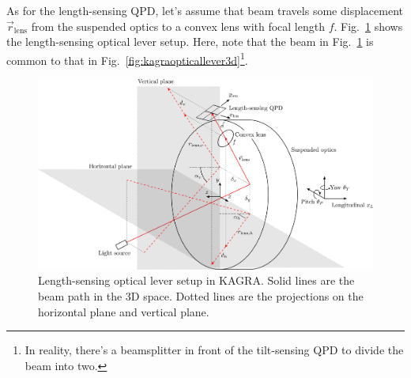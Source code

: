 As for the length-sensing QPD, let's assume that beam travels some displacement $\vec{r}_\mathrm{lens}$ from the suspended optics to a convex lens with focal length $f$. Fig.~\ref{fig:kagralengthopticallever3d} shows the length-sensing optical lever setup.
Here, note that the beam in Fig.~\ref{fig:kagralengthopticallever3d} is common to that in Fig.~\ref{fig:kagraopticallever3d}\footnote{In reality, there's a beamsplitter in front of the tilt-sensing QPD to divide the beam into two.}.
\begin{figure}[!h]
	\centering
	\includegraphics[width=0.7\linewidth]{figures/kagra_length_optical_lever_3d}
	\caption{Length-sensing optical lever setup in KAGRA. Solid lines are the beam path in the 3D space. Dotted lines are the projections on the horizontal plane and vertical plane.}
	\label{fig:kagralengthopticallever3d}
\end{figure}

